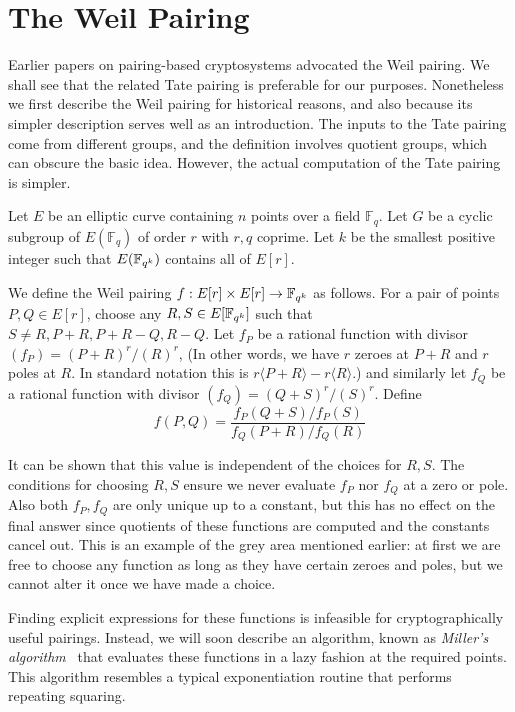 \section {The Weil Pairing}

Earlier papers on pairing-based cryptosystems advocated the Weil pairing.
We shall see that the related Tate pairing is preferable for our purposes.
Nonetheless we first describe the Weil pairing for historical reasons, and also
because its simpler description serves well as an introduction. The inputs to
the Tate pairing come from different groups, and the definition involves
quotient groups, which can obscure the basic idea. However, the actual
computation of the Tate pairing is simpler.

Let $E$ be an elliptic curve containing $n$ points over a field $\mathbb{F}_q$.
Let $G$ be a cyclic subgroup of $E(\mathbb{F}_q)$ of order $r$ with $r, q$
coprime. Let $k$ be the smallest positive integer such that $E(\mathbb{F}_{q^k})$
contains all of $E[r]$.

We define the Weil pairing $f:E[r] \times E[r] \rightarrow \mathbb{F}_{q^k}$ as follows.
For a pair of points $P, Q \in E[r]$,
choose any $R, S \in E[\mathbb{F}_{q^k}]$ such that $S \ne R, P+R, P+R - Q, R-Q$.
Let $f_P$ be a rational function with divisor $(f_P) = (P+R)^r /(R)^r$,
(In other words, we have $r$ zeroes at $P+R$ and $r$ poles at $R$.
In standard notation this is $r\langle P+R\rangle  - r\langle R\rangle$.)
and similarly let $f_Q$ be a rational function with divisor
$(f_Q) = (Q+S)^r/(S)^r$.
Define
\[ f(P,Q) = \frac{f_P(Q+S)/f_P(S)}{f_Q(P+R)/f_Q(R)} \]

It can be shown that this value is independent
of the choices for $R, S$. The conditions for choosing $R, S$ ensure
we never evaluate $f_P$ nor $f_Q$ at a zero or pole.
Also both $f_P, f_Q$ are only unique up to a constant,
but this has no effect on the final answer since quotients
of these functions are computed and the constants cancel out.
This is an example of the grey area mentioned earlier:
at first we are free to choose
any function as long as they have certain zeroes and poles, but we cannot
alter it once we have made a choice.

Finding explicit expressions for these functions is infeasible for
cryptographically useful pairings. Instead, we will soon describe
an algorithm, known as \emph{Miller's algorithm}~\cite{miller,millerpub}
that evaluates these functions in a lazy fashion at the required
points. This algorithm resembles a typical exponentiation routine
that performs repeating squaring.

